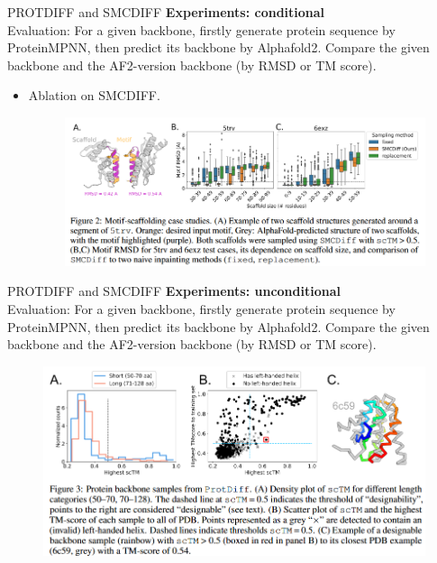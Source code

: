 \documentclass[notheorems, aspectratio=54]{beamer}
\begin{document}
\begin{frame}{PROTDIFF and SMCDIFF}
  \textbf{Experiments: conditional}\\
  Evaluation: For a given backbone, firstly generate protein sequence by ProteinMPNN, then predict its backbone by Alphafold2. Compare the given backbone and the AF2-version backbone (by RMSD or TM score).
  \begin{itemize}
    \item Ablation on SMCDIFF. 
    \begin{figure}[!h]
      \centering
      \includegraphics[width=0.9\linewidth]{figures/ProtDIFF_fig2.png}
  \end{figure}
  \end{itemize}
\end{frame}

\begin{frame}{PROTDIFF and SMCDIFF}
  \textbf{Experiments: unconditional}\\
  Evaluation: For a given backbone, firstly generate protein sequence by ProteinMPNN, then predict its backbone by Alphafold2. Compare the given backbone and the AF2-version backbone (by RMSD or TM score).
  \begin{figure}[!h]
    \centering
    \includegraphics[width=0.9\linewidth]{figures/ProtDIFF_fig3.png}
  \end{figure}
\end{frame}
\end{document}
